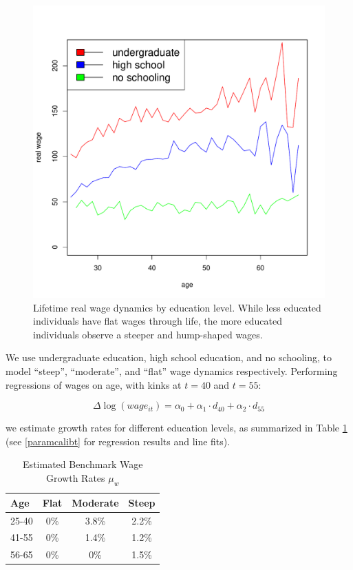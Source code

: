 \documentclass[]{elsarticle}
\begin{document}
\begin{figure}[h]
	\centering
	\includegraphics[scale=0.4]{figs/wage2educ.pdf}
	\caption{Lifetime real wage dynamics by education level. While less educated individuals have flat wages through life, the more educated individuals observe a steeper and hump-shaped wages.}
	\label{fig:wageeduc}
\end{figure}

We use undergraduate education, high school education, and no schooling, to model ``steep'', ``moderate'', and ``flat'' wage dynamics respectively. Performing regressions of wages on age, with kinks at $t=40$ and $t=55$:

\begin{equation}
	\Delta \log (wage_{it}) = \alpha_0 + \alpha_1 \cdot d_{40} + \alpha_2 \cdot d_{55}
\end{equation}

we estimate growth rates for different education levels, as summarized in Table \ref{table:dincome} (see \ref{paramcalibt} for regression results and line fits). 

\begin{table}[h!]
	\centering
	\caption{Estimated Benchmark Wage Growth Rates $\mu_w$}
	\label{table:dincome}
	\begin{tabular}[c]{l|ccc}
		Age&Flat&Moderate&Steep\\
		\hline
		25-40&0\%&3.8\%&2.2\%\\
		41-55&0\%&1.4\%&1.2\%\\
		56-65&0\%&0\%&1.5\%\\
	\end{tabular}
\end{table}
\end{document}
